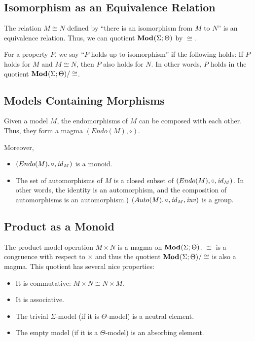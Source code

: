 \subsection{Isomorphism as an Equivalence Relation}

The relation $M\cong N$ defined by ``there is an isomorphism from $M$ to $N$'' is an equivalence relation.
Thus, we can quotient ${\mathbf{Mod}^{}}(\Sigma;\Theta)$ by $\cong$.

For a property $P$, we say ``$P$ holds up to isomorphism'' if the following holds: If $P$ holds for $M$ and $M\cong N$, then $P$ also holds for $N$.
In other words, $P$ holds in the quotient ${\mathbf{Mod}^{}}(\Sigma;\Theta)/\cong$.

\subsection{Models Containing Morphisms}

Given a model $M$, the endomorphisms of $M$ can be composed with each other.
Thus, they form a magma $(Endo(M),\circ)$.

Moreover,
\begin{itemize}
\item $(Endo(M),\circ, \mathit{id}_{M})$ is a monoid.
\item The set of automorphisms of $M$ is a closed subset of $(Endo(M),\circ, \mathit{id}_{M})$.
In other words, the identity is an automorphism, and the composition of automorphisms is an automorphism.)
$(Auto(M),\circ, \mathit{id}_{M},\mathit{inv})$ is a group.
\end{itemize}

\subsection{Product as a Monoid}

The product model operation $M\times N$ is a magma on ${\mathbf{Mod}^{}}(\Sigma;\Theta)$.
$\cong$ is a congruence with respect to $\times$ and thus the quotient ${\mathbf{Mod}^{}}(\Sigma;\Theta)/\cong$ is also a magma.
This quotient has several nice properties:
\begin{itemize}
 \item It is commutative: $M\times N\cong N\times M$.
 \item It is associative.
 \item The trivial $\Sigma$-model (if it is $\Theta$-model) is a neutral element.
 \item The empty model (if it is a $\Theta$-model) is an absorbing element.
\end{itemize}

